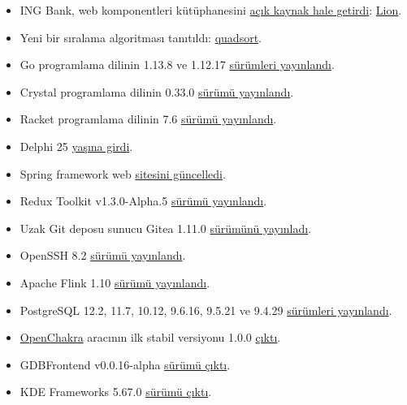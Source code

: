 \documentclass[11pt]{article}
\begin{document}
\begin{itemize}
{yayınladı}. \href{https://github.com/google/tcmalloc}{GitHub Deposu}
\item ING Bank, web komponentleri kütüphanesini \href{https://medium.com/ing-blog/ing-open-sources-lion-a-library-for-performant-accessible-flexible-web-components-22ad165b1d3d}{açık kaynak hale getirdi}: \href{https://github.com/ing-bank/lion}{Lion}.
\item Yeni bir sıralama algoritması tanıtıldı: \href{https://github.com/scandum/quadsort}{quadsort}.
\item Go programlama dilinin 1.13.8 ve 1.12.17 \href{https://golang.org/doc/devel/release.html\#go1.13.minor}{sürümleri yayınlandı}.
\item Crystal programlama dilinin 0.33.0 \href{https://crystal-lang.org/2020/02/14/crystal-0.33.0-released.html}{sürümü yayınlandı}.
\item Racket programlama dilinin 7.6 \href{https://download.racket-lang.org/v7.6.html}{sürümü yayınlandı}.
\item Delphi 25 \href{https://community.idera.com/developer-tools/b/blog/posts/25-years-of-excellence}{yaşına girdi}.
\item Spring framework web \href{https://spring.io/blog/2020/02/14/announcing-the-new-spring-website}{sitesini güncelledi}.
\item Redux Toolkit v1.3.0-Alpha.5 \href{https://github.com/reduxjs/redux-toolkit/releases/tag/v1.3.0-alpha.5}{sürümü yayınlandı}.
\item Uzak Git deposu sunucu Gitea 1.11.0 \href{https://blog.gitea.io/2020/02/gitea-1.11.0-is-released/}{sürümünü yayınladı}.
\item OpenSSH 8.2 \href{https://lists.mindrot.org/pipermail/openssh-unix-announce/2020-February/000138.html}{sürümü yayınlandı}.
\item Apache Flink 1.10 \href{https://flink.apache.org/news/2020/02/11/release-1.10.0.html}{sürümü yayınlandı}.
\item PostgreSQL 12.2, 11.7, 10.12, 9.6.16, 9.5.21 ve 9.4.29 \href{https://www.postgresql.org/about/news/2011/}{sürümleri yayınlandı}.
\item \href{https://openchakra.app/}{OpenChakra} aracının ilk stabil versiyonu 1.0.0 \href{https://github.com/premieroctet/openchakra/releases/tag/v1.0.0}{çıktı}.
\item GDBFrontend v0.0.16-alpha \href{https://github.com/rohanrhu/gdb-frontend/releases/tag/v0.0.16-alpha}{sürümü çıktı}.
\item KDE Frameworks 5.67.0 \href{https://kde.org/announcements/kde-frameworks-5.67.0.php}{sürümü çıktı}.
\end{itemize}
\end{document}
